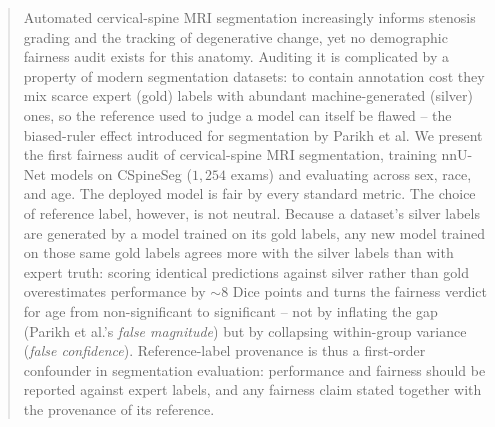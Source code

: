 \begin{abstract}
Automated cervical-spine MRI segmentation increasingly informs stenosis grading and
the tracking of degenerative change, yet no demographic fairness audit exists for this
anatomy. Auditing it is complicated by a property of modern segmentation datasets: to
contain annotation cost they mix scarce expert (gold) labels with abundant
machine-generated (silver) ones, so the reference used to judge a model can itself be
flawed -- the biased-ruler effect introduced for segmentation by Parikh et al. We
present the first fairness audit of cervical-spine MRI segmentation, training nnU-Net
models on CSpineSeg ($1{,}254$ exams) and evaluating across sex, race, and age. The
deployed model is fair by every standard metric. The choice of reference label,
however, is not neutral. Because a dataset's silver labels are generated by a model
trained on its gold labels, any new model trained on those same gold labels agrees more
with the silver labels than with expert truth: scoring identical predictions against
silver rather than gold overestimates performance by ${\sim}8$ Dice points and turns
the fairness verdict for age from non-significant to significant -- not by inflating the
gap (Parikh et al.'s \emph{false magnitude}) but by collapsing within-group variance
(\emph{false confidence}). Reference-label provenance
is thus a first-order confounder in segmentation evaluation: performance and fairness
should be reported against expert labels, and any fairness claim stated together with
the provenance of its reference.

\end{abstract}
